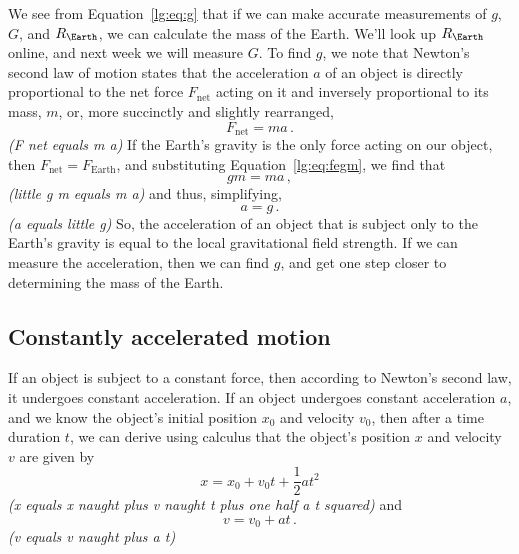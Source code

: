 We see from Equation~\ref{lg:eq:g} that if we can make accurate measurements of $g$, $G$, and $R_\Earth$, we can calculate the mass of the Earth. We'll look up $R_\Earth$ online, and next week we will measure $G$. To find $g$, we note that Newton's second law of motion states that the acceleration $a$ of an object is directly proportional to the net force $F_\textrm{net}$ acting on it and inversely proportional to its mass, $m$, or, more succinctly and slightly rearranged,
\begin{equation}
 F_\textrm{net} = m a \,.
\end{equation}
\textit{(F net equals m a)}\newline
If the Earth's gravity is the only force acting on our object, then $F_\textrm{net} = F_\textrm{Earth}$, and substituting Equation~\ref{lg:eq:fegm}, we find that
\begin{equation}
 g m = m a \,,
\end{equation}
\textit{(little g m equals m a)}\newline
and thus, simplifying,
\begin{equation}
 a = g \,.
\end{equation}
\textit{(a equals little g)}\newline
So, the acceleration of an object that is subject only to the Earth's gravity is equal to the local gravitational field strength. If we can measure the acceleration, then we can find $g$, and get one step closer to determining the mass of the Earth.

\subsection{Constantly accelerated motion}

If an object is subject to a constant force, then according to Newton's second law, it undergoes constant acceleration. If an object undergoes constant acceleration $a$, and we know the object's initial position $x_0$ and velocity $v_0$, then after a time duration $t$, we can derive using calculus that the object's position $x$ and velocity $v$ are given by
\begin{equation}\label{lg:eq:x-const-a}
 x = x_0 + v_0 t + \frac{1}{2} a t^2
\end{equation}
\textit{(x equals x naught plus v naught t plus one half a t squared)}\newline
and
\begin{equation}
 v = v_0 + a t \,.
\end{equation}
\textit{(v equals v naught plus a t)}\newline

